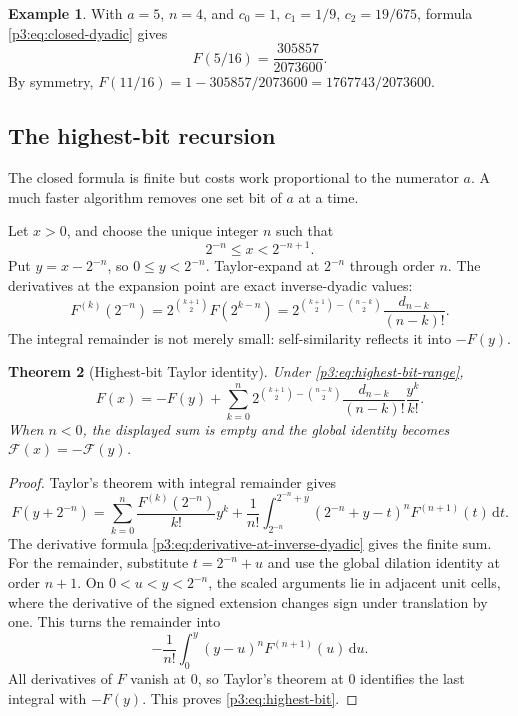 \documentclass[11pt]{article}
\numberwithin{equation}{section}
\newtheorem{theorem}{Theorem}[section]
\theoremstyle{definition}
\newtheorem{example}[theorem]{Example}
\theoremstyle{remark}
\newcommand{\GF}{\mathcal F}
\newcommand{\dd}{\,\mathrm d}
\begin{document}
\begin{example}\label{p3:ex:five-sixteenths}
With $a=5$, $n=4$, and $c_0=1$, $c_1=1/9$, $c_2=19/675$, formula \eqref{p3:eq:closed-dyadic} gives
\begin{equation}\label{p3:eq:five-sixteenths}
 F(5/16)=\frac{305857}{2073600}.
\end{equation}
By symmetry,
$F(11/16)=1-305857/2073600=1767743/2073600$.
\end{example}

\subsection{The highest-bit recursion}\label{p3:subsec:highest-bit}

The closed formula is finite but costs work proportional to the numerator $a$.  A much faster algorithm removes one set bit of $a$ at a time.

Let $x>0$, and choose the unique integer $n$ such that
\begin{equation}\label{p3:eq:highest-bit-range}
 2^{-n}\le x<2^{-n+1}.
\end{equation}
Put $y=x-2^{-n}$, so $0\le y<2^{-n}$.  Taylor-expand at $2^{-n}$ through order $n$.  The derivatives at the expansion point are exact inverse-dyadic values:
\begin{equation}\label{p3:eq:derivative-at-inverse-dyadic}
 F^{(k)}(2^{-n})
 =2^{\binom{k+1}{2}}F(2^{k-n})
 =2^{\binom{k+1}{2}-\binom{n-k}{2}}
   \frac{d_{n-k}}{(n-k)!}.
\end{equation}
The integral remainder is not merely small: self-similarity reflects it into $-F(y)$.

\begin{theorem}[Highest-bit Taylor identity]\label{p3:thm:highest-bit}
Under \eqref{p3:eq:highest-bit-range},
\begin{equation}\label{p3:eq:highest-bit}
\boxed{
 F(x)=-F(y)+
 \sum_{k=0}^{n}
 2^{\binom{k+1}{2}-\binom{n-k}{2}}
 \frac{d_{n-k}}{(n-k)!}\frac{y^k}{k!}.}
\end{equation}
When $n<0$, the displayed sum is empty and the global identity becomes
$\GF(x)=-\GF(y)$.
\end{theorem}

\begin{proof}
Taylor's theorem with integral remainder gives
\begin{equation}\label{p3:eq:highest-bit-Taylor-proof}
 F(y+2^{-n})=
 \sum_{k=0}^{n}\frac{F^{(k)}(2^{-n})}{k!}y^k
 +\frac1{n!}\int_{2^{-n}}^{2^{-n}+y}
       (2^{-n}+y-t)^nF^{(n+1)}(t)\dd t.
\end{equation}
The derivative formula \eqref{p3:eq:derivative-at-inverse-dyadic} gives the finite sum.  For the remainder, substitute $t=2^{-n}+u$ and use the global dilation identity at order $n+1$.  On $0<u<y<2^{-n}$, the scaled arguments lie in adjacent unit cells, where the derivative of the signed extension changes sign under translation by one.  This turns the remainder into
\[
 -\frac1{n!}\int_0^y(y-u)^nF^{(n+1)}(u)\dd u.
\]
All derivatives of $F$ vanish at $0$, so Taylor's theorem at $0$ identifies the last integral with $-F(y)$.  This proves \eqref{p3:eq:highest-bit}.
\end{proof}
\end{document}
